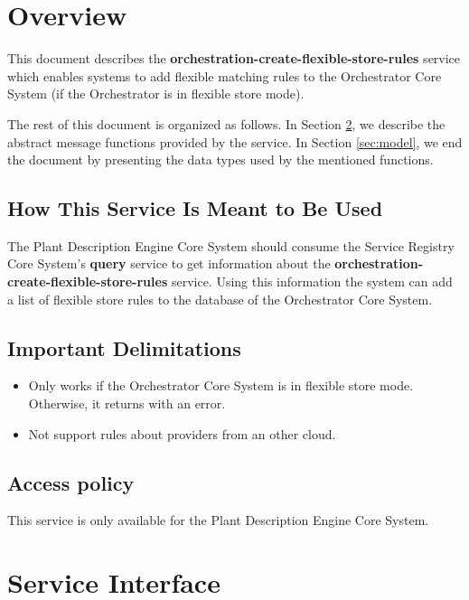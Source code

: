 \documentclass[a4paper]{arrowhead}
\begin{document}
\tableofcontents
\newpage

\section{Overview}
\label{sec:overview}
This document describes the \textbf{orchestration-create-flexible-store-rules} service which enables systems to add flexible matching rules to the Orchestrator Core System (if the Orchestrator is in flexible store mode).

The rest of this document is organized as follows.
In Section \ref{sec:functions}, we describe the abstract message functions provided by the service.
In Section \ref{sec:model}, we end the document by presenting the data types used by the mentioned functions.

\subsection{How This Service Is Meant to Be Used}
The Plant Description Engine Core System should consume the Service Registry Core System’s \textbf{query} service to get information about the \textbf{orchestration-create-flexible-store-rules} service. Using this information the system can add a list of flexible store rules to the database of the Orchestrator Core System.

\subsection{Important Delimitations}
\label{sec:delimitations}

\begin{itemize}
    \item Only works if the Orchestrator Core System is in flexible store mode. Otherwise, it returns with an error.
    \item Not support rules about providers from an other cloud.
\end{itemize}

\subsection{Access policy}
\label{sec:accesspolicy}

This service is only available for the Plant Description Engine Core System.

\newpage

\section{Service Interface}
\label{sec:functions}
\end{document}
